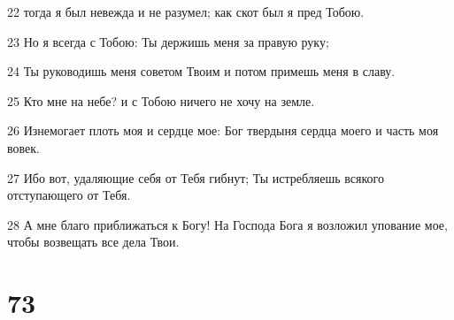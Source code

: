 \par 22 тогда я был невежда и не разумел; как скот был я пред Тобою.
\par 23 Но я всегда с Тобою: Ты держишь меня за правую руку;
\par 24 Ты руководишь меня советом Твоим и потом примешь меня в славу.
\par 25 Кто мне на небе? и с Тобою ничего не хочу на земле.
\par 26 Изнемогает плоть моя и сердце мое: Бог твердыня сердца моего и часть моя вовек.
\par 27 Ибо вот, удаляющие себя от Тебя гибнут; Ты истребляешь всякого отступающего от Тебя.
\par 28 А мне благо приближаться к Богу! На Господа Бога я возложил упование мое, чтобы возвещать все дела Твои.

\chapter{73}

